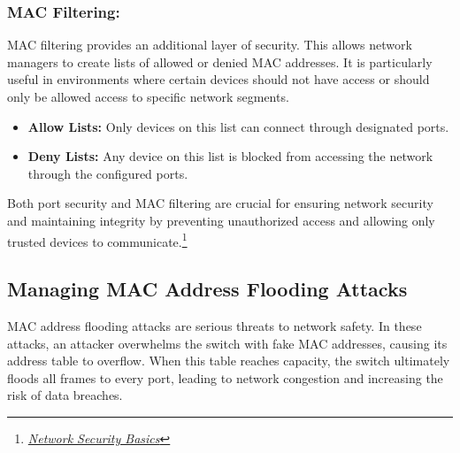 \documentclass[11pt,a4paper]{article}
\begin{document}
\subsubsection*{MAC Filtering:} MAC filtering provides an additional layer of security. This allows network managers to create lists of allowed or denied MAC addresses. It is particularly useful in environments where certain devices should not have access or should only be allowed access to specific network segments.
    \begin{itemize}
        \item \textbf{Allow Lists:} Only devices on this list can connect through designated ports.
        \item \textbf{Deny Lists:} Any device on this list is blocked from accessing the network through the configured ports.
    \end{itemize}

Both port security and MAC filtering are crucial for ensuring network security and maintaining integrity by preventing unauthorized access and allowing only trusted devices to communicate.\footnote{\href{https://ccna-classes.com/ccna-study-resources/port-security-vs-mac-address-filtering/}{\textit{Network Security Basics}}}


\subsection*{Managing MAC Address Flooding Attacks}
MAC address flooding attacks are serious threats to network safety. In these attacks, an attacker overwhelms the switch with fake MAC addresses, causing its address table to overflow. When this table reaches capacity, the switch ultimately floods all frames to every port, leading to network congestion and increasing the risk of data breaches.
\end{document}
